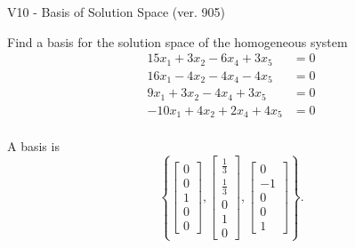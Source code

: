 \begin{exercise}
  \begin{exerciseTitle}V10 - Basis of Solution Space (ver. 905)\end{exerciseTitle}
  \begin{exerciseStatement}
    Find a basis for the solution space of the homogeneous system 
\begin{align*}
 15 x_ 1 + 3 x_ 2 -6 x_ 4 + 3 x_ 5 &= 0  \\ 
  16 x_ 1 -4 x_ 2 -4 x_ 4 -4 x_ 5 &= 0  \\ 
  9 x_ 1 + 3 x_ 2 -4 x_ 4 + 3 x_ 5 &= 0  \\ 
  -10 x_ 1 + 4 x_ 2 + 2 x_ 4 + 4 x_ 5 &= 0  \\ 
 \end{align*}


 
  \end{exerciseStatement}

  \begin{exerciseAnswer}
   A basis is   
\[\left\{\left[\begin{array}{c}
0 \\
0 \\
1 \\
0 \\
0
\end{array}\right] , \left[\begin{array}{c}
\frac{1}{3} \\
\frac{1}{3} \\
0 \\
1 \\
0
\end{array}\right] , \left[\begin{array}{c}
0 \\
-1 \\
0 \\
0 \\
1
\end{array}\right]\right\}.\]

  


  \end{exerciseAnswer}
\end{exercise}